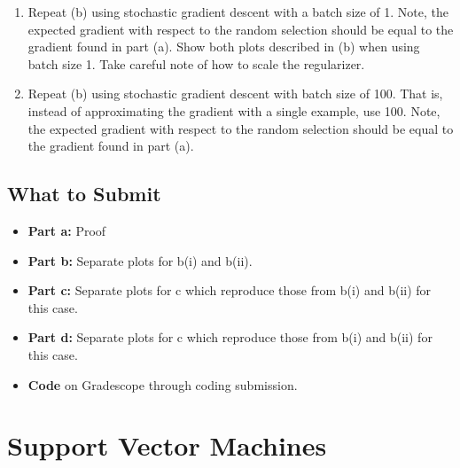 \documentclass{article}
\begin{document}
\begin{aprob}
\begin{enumerate}
        \item {} Repeat (b) using stochastic gradient descent with a batch size of 1. Note, the expected gradient with respect to the random selection should be equal to the gradient found in part (a). Show both plots described in (b) when using batch size 1. Take careful note of how to scale the regularizer.
        \item {} Repeat (b) using stochastic gradient descent with batch size of 100. That is, instead of approximating the gradient with a single example, use 100. Note, the expected gradient with respect to the random selection should be equal to the gradient found in part (a).
    \end{enumerate}
    
    \subsection*{What to Submit}
    \begin{itemize}
        \item \textbf{Part a:} Proof
        \item \textbf{Part b:} Separate plots for b(i) and b(ii).
        \item \textbf{Part c:} Separate plots for c which reproduce those from b(i) and b(ii) for this case.
        \item \textbf{Part d:} Separate plots for c which reproduce those from b(i) and b(ii) for this case.
        \item \textbf{Code} on Gradescope through coding submission.
    \end{itemize}
\end{aprob}

\section*{Support Vector Machines}
\end{document}
